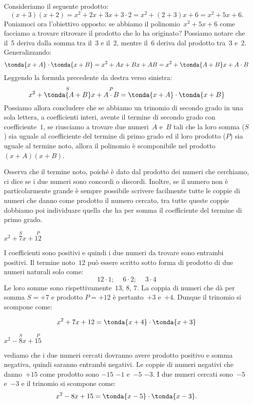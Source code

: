 Consideriamo il seguente prodotto:
\[(x+3)(x+2)=x^2+2x+3x+3 \cdot 2=x^2+(2+3)x+6=x^2+5x+6.\]
Poniamoci ora l'obiettivo opposto: se abbiamo il
polinomio~\(x^2+5x+6\) come facciamo a trovare ritrovare il prodotto
che lo ha originato? Possiamo notare che il~5 deriva dalla somma tra
il~3 e il~2, mentre il~6 deriva dal prodotto tra~3 e~2. Generalizzando:
\[\tonda{x+A}\cdot \tonda{x+B}=
  x^{{2}}+Ax+Bx+AB=x^2+\tonda{A+B}x+A\cdot B\]
Leggendo la formula precedente da destra verso sinistra:
\[x^{{2}}+\overset{S}{\tonda{A+B}}x+\overset{P}{A \cdot B}
=\tonda{x+A}\cdot\tonda{x+B}\]
Possiamo allora concludere che se abbiamo un trinomio di secondo grado
in una sola lettera, a coefficienti interi, avente il termine di
secondo grado con coefficiente~\(1\), se riusciamo a trovare due numeri~\(A\) 
e~\(B\) tali che la loro somma (\(S\)) sia uguale al
coefficiente del termine di primo grado ed il loro prodotto (\(P\)) sia 
uguale al termine noto, allora il polinomio è scomponibile nel 
prodotto~\((x+A)(x+B)\).

Osserva che il termine noto, poiché è dato dal prodotto dei numeri
che cerchiamo, ci dice se i due numeri sono concordi o discordi.
Inoltre, se il numero non è particolarmente grande è sempre
possibile scrivere facilmente tutte le coppie di numeri che danno come
prodotto il numero cercato, tra tutte queste coppie dobbiamo poi
individuare quella che ha per somma il coefficiente del termine di
primo grado.

 \begin{esempio}
 \(x^2+\overset{S}{7}x+\overset{P}{12}\)

I coefficienti sono positivi e quindi i due numeri da trovare sono
entrambi positivi.
Il termine noto~\(12\) può essere scritto sotto forma di prodotto di due
numeri naturali solo come:
\[12\cdot 1;\quad~6\cdot 2;\quad~3\cdot 4\]
Le loro somme sono rispettivamente~\(13\), \(8\), \(7\). 
La coppia di numeri che dà per somma \(S=+7\) e prodotto \(P=+12\) è 
pertanto~\(+3\) e~\(+4\). 
Dunque il trinomio si scompone come:

\[x^2+7x+12=\tonda{x+4} \cdot \tonda{x+3}\]
 \end{esempio}

 \begin{esempio}
 \(x^2-\overset{S}{8}x+\overset{P}{15}\)

vediamo che i due numeri cercati dovranno avere 
prodotto positivo e somma negativa, quindi saranno entrambi negativi. 
Le coppie di numeri negativi che danno~\(+15\) come prodotto sono \(-15\) 
\(-1\) e~\(-5\) \(-3\).
I due numeri cercati sono~\(-5\) e~\(-3\) e il trinomio si scompone come:
\[x^2-8x+15=\tonda{x-5}\cdot \tonda{x-3}.\]
 \end{esempio}

